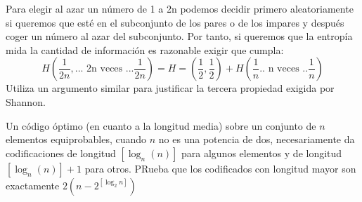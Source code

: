 \begin{problem}[18]
Para elegir al azar un número de 1 a 2n podemos decidir primero aleatoriamente si queremos que esté en el subconjunto de los pares o de los impares y después coger un número al azar del subconjunto. Por tanto, si queremos que la entropía mida la cantidad de información es razonable exigir que cumpla:
\[H \left( \frac{1}{2n},... \text{ 2n veces } ... \frac{1}{2n}\right)=H=\left(\frac{1}{2},\frac{1}{2}\right)+H \left(\frac{1}{n} .. \text{ n veces }.. \frac{1}{n} \right)\]
Utiliza un argumento similar para justificar la tercera propiedad exigida por Shannon.
\solution
\end{problem}

\begin{problem}[19]
Un código óptimo (en cuanto a la longitud media) sobre un conjunto de $n$ elementos equiprobables, cuando $n$ no es una potencia de dos, necesariamente da codificaciones de longitud $[\log_n (n)]$ para algunos elementos y de longitud $[\log_n (n)]+1$ para otros. PRueba que los codificados con longitud mayor son exactamente $2\left( n -2^{[\log_2 n]}\right)$
\solution

\end{problem}
